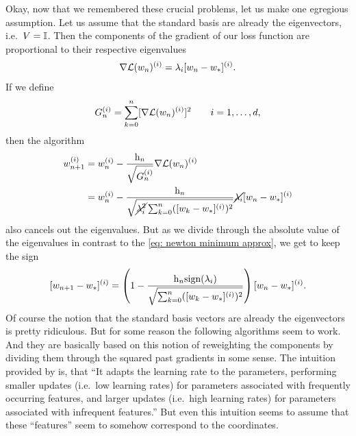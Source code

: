 Okay, now that we remembered these crucial problems, let us make one egregious
assumption. Let us assume that the standard basis are already the eigenvectors,
i.e.\ \(V=\mathbb{I}\). Then the components of the gradient of our loss function
are proportional to their respective eigenvalues
\begin{align*}
	\nabla\mathcal{L}(w_n)^{(i)}
	= \lambda_i [w_n - w_*]^{(i)}.
\end{align*}
If we define
\begin{align*}
	G_n^{(i)} = \sum_{k=0}^n [\nabla\mathcal{L}(w_n)^{(i)}]^2 \qquad i=1,\dots,d,
\end{align*}
then the algorithm
\begin{align}
	\label{eq: almost adagrad}
	w_{n+1}^{(i)}
	&= w_n^{(i)} - \frac{\text{h}_n}{\sqrt{G_n^{(i)}}}\nabla\mathcal{L}(w_n)^{(i)}\\
	\nonumber
	&= w_n^{(i)} - \frac{\text{h}_n}{
		\sqrt{\cancel{\lambda_i^2}\sum_{k=0}^n([w_k - w_*]^{(i)})^2}
	}
	\cancel{\lambda_i}[w_n - w_*]^{(i)}
\end{align}
also cancels out the eigenvalues. But as we divide through the absolute value of
the eigenvalues in contrast to the \ref{eq: newton minimum approx}, we get to
keep the sign
\begin{align}\label{eq: adagrad motivation contraction}
	[w_{n+1}-w_*]^{(i)} = \left(1-\frac{\text{h}_n\text{sign}(\lambda_i)}{
			\sqrt{\sum_{k=0}^n([w_k - w_*]^{(i)})^2}
		}\right)[w_n - w_*]^{(i)}.
\end{align}
Of course the notion that the standard basis vectors are already the eigenvectors
is pretty ridiculous. But for some reason the following algorithms seem to
work. And they are basically based on this notion of reweighting the components
by dividing them through the squared past gradients in some sense. The intuition
provided by \textcite{ruderOverviewGradientDescent2017} is, that
``It adapts the learning rate to the parameters, performing smaller updates
(i.e.\ low learning rates) for parameters associated with frequently occurring
features, and larger updates (i.e.\ high learning rates) for parameters
associated with infrequent features.'' But even this intuition seems to assume
that these ``features'' seem to somehow correspond to the coordinates.

